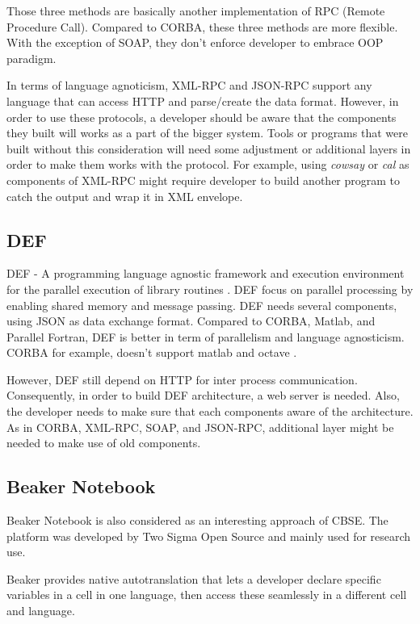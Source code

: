 \documentclass[conference]{IEEEtran}
\begin{document}
Those three methods are basically another implementation of RPC (Remote Procedure Call). 
Compared to CORBA, these three methods are more flexible. With the exception of SOAP,
they don't enforce developer to embrace OOP paradigm.

In terms of language agnoticism, XML-RPC and JSON-RPC support any language that can
access HTTP and parse/create the data format. However, in order to use these protocols,
a developer should be aware that the components they built will works as a part of the
bigger system. Tools or programs that were built without this consideration will need
some adjustment or additional layers in order to make them works with the protocol.
For example, using {\it{cowsay}} or {\it{cal}} as components of XML-RPC might require
developer to build another program to catch the output and wrap it in XML envelope.

\subsection{DEF}

DEF - A programming language agnostic framework and execution environment 
for the parallel execution of library routines \cite{feilhauer2016def}. 
DEF focus on parallel processing by enabling shared memory and message passing. 
DEF needs several components, using JSON as data exchange format. 
Compared to CORBA, Matlab, and Parallel Fortran, DEF is better in term of 
parallelism and language agnosticism. CORBA for example, doesn't support matlab and 
octave \cite{feilhauer2016def}. 

However, DEF still depend on HTTP for inter process communication. Consequently, 
in order to build DEF architecture, a web server is needed. Also, the developer needs 
to make sure that each components aware of the architecture. As in CORBA, XML-RPC, 
SOAP, and JSON-RPC, additional layer might be needed to make use of old components.

\subsection{Beaker Notebook}

Beaker Notebook \cite{beakernotebook} is also considered as an interesting 
approach of CBSE. The platform was developed by Two Sigma Open Source and 
mainly used for research use. 

Beaker provides native autotranslation that lets a developer declare specific 
variables in a cell in one language, then access these seamlessly in a 
different cell and language.
\end{document}
